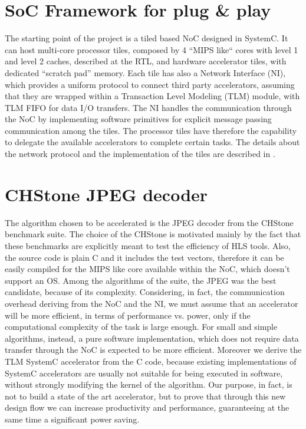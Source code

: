 \documentclass{acm_proc_article-sp}
\begin{document}
\section{SoC Framework for {\subsecit plug \& play} }
\label{sec:nof}

The starting point of the project is a tiled based NoC designed in SystemC.
It can host multi-core processor tiles, composed by 4 ``MIPS like`` cores with level
1 and level 2 caches, described at the RTL, and hardware accelerator tiles,
with dedicated ``scratch pad'' memory. Each tile has also a Network Interface (NI),
which provides a uniform protocol to connect third party accelerators, assuming
that they are wrapped within a Transaction Level Modeling (TLM) module, with TLM FIFO
for data I/O transfers. The NI handles the communication through the NoC by implementing
software primitives for explicit message passing communication among the tiles.
The processor tiles have therefore the capability to delegate the available
accelerators to complete certain tasks. The details about the network protocol
and the implementation of the tiles are described in \cite{cota}.

\section{CHStone JPEG decoder}
\label{sec:jpeg}

The algorithm chosen to be accelerated is the JPEG decoder from the CHStone
\cite{chstone} benchmark suite. The choice of the CHStone is motivated mainly by
the fact that these benchmarks are explicitly meant to test the efficiency of
HLS tools. Also, the source code is plain C and it includes the
test vectors, therefore it can be easily compiled for the MIPS like core
available within the NoC, which doesn't support an OS. Among the algorithms of
the suite, the JPEG was the best candidate, because of its complexity.
Considering, in fact, the communication overhead deriving from the NoC and the
NI, we must assume that an accelerator will be more efficient, in terms of
performance vs. power, only if the computational complexity of the task is large
enough. For small and simple algorithms, instead, a pure software
implementation, which does not require data transfer through the NoC is expected
to be more efficient.
Moreover we derive the TLM SystemC accelerator from the C code,
because existing implementations of SystemC accelerators are usually not
suitable for being executed in software, without strongly modifying the kernel
of the algorithm. Our purpose, in fact, is not to build a state of the art
accelerator, but to prove that through this new design flow we can increase
productivity and performance, guaranteeing at the same time a significant power
saving.
\end{document}
